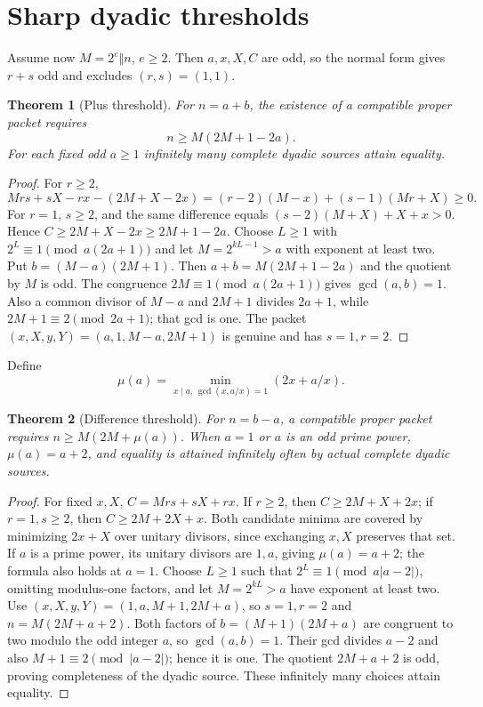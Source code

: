 \documentclass[11pt]{amsart}
\newtheorem{theorem}{Theorem}[section]
\theoremstyle{definition}\newtheorem{definition}[theorem]{Definition}
\theoremstyle{remark}\newtheorem{remark}[theorem]{Remark}
\begin{document}
\section{Sharp dyadic thresholds}
Assume now $M=2^e\Vert n$, $e\ge2$. Then $a,x,X,C$ are odd, so the normal form gives $r+s$ odd and excludes $(r,s)=(1,1)$.
\begin{theorem}[Plus threshold]\label{thm:plus}
For $n=a+b$, the existence of a compatible proper packet requires
\[
 n\ge M(2M+1-2a).
\]
For each fixed odd $a\ge1$ infinitely many complete dyadic sources attain equality.
\end{theorem}
\begin{proof}
For $r\ge2$,
\[
 Mrs+sX-rx-(2M+X-2x)=(r-2)(M-x)+(s-1)(Mr+X)\ge0.
\]
For $r=1$, $s\ge2$, and the same difference equals $(s-2)(M+X)+X+x>0$. Hence $C\ge2M+X-2x\ge2M+1-2a$.
Choose $L\ge1$ with $2^L\equiv1\pmod{a(2a+1)}$ and let $M=2^{kL-1}>a$ with exponent at least two. Put $b=(M-a)(2M+1)$. Then $a+b=M(2M+1-2a)$ and the quotient by $M$ is odd. The congruence $2M\equiv1\pmod{a(2a+1)}$ gives $\gcd(a,b)=1$. Also a common divisor of $M-a$ and $2M+1$ divides $2a+1$, while $2M+1\equiv2\pmod{2a+1}$; that gcd is one. The packet $(x,X,y,Y)=(a,1,M-a,2M+1)$ is genuine and has $s=1,r=2$.
\end{proof}
Define
\[
 \mu(a)=\min_{x\mid a,\,\gcd(x,a/x)=1}(2x+a/x).
\]
\begin{theorem}[Difference threshold]\label{thm:minus}
For $n=b-a$, a compatible proper packet requires $n\ge M(2M+\mu(a))$. When $a=1$ or $a$ is an odd prime power, $\mu(a)=a+2$, and equality is attained infinitely often by actual complete dyadic sources.
\end{theorem}
\begin{proof}
For fixed $x,X$, $C=Mrs+sX+rx$. If $r\ge2$, then $C\ge2M+X+2x$; if $r=1,s\ge2$, then $C\ge2M+2X+x$. Both candidate minima are covered by minimizing $2x+X$ over unitary divisors, since exchanging $x,X$ preserves that set. If $a$ is a prime power, its unitary divisors are $1,a$, giving $\mu(a)=a+2$; the formula also holds at $a=1$.
Choose $L\ge1$ such that $2^L\equiv1\pmod{a|a-2|}$, omitting modulus-one factors, and let $M=2^{kL}>a$ have exponent at least two. Use $(x,X,y,Y)=(1,a,M+1,2M+a)$, so $s=1,r=2$ and $n=M(2M+a+2)$. Both factors of $b=(M+1)(2M+a)$ are congruent to two modulo the odd integer $a$, so $\gcd(a,b)=1$. Their gcd divides $a-2$ and also $M+1\equiv2\pmod{|a-2|}$; hence it is one. The quotient $2M+a+2$ is odd, proving completeness of the dyadic source. These infinitely many choices attain equality.
\end{proof}
\end{document}
